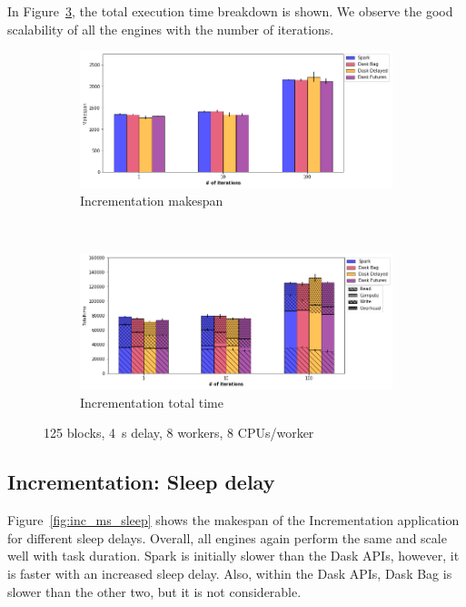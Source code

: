\documentclass[conference]{IEEEtran}
\begin{document}
In Figure~\ref{fig:inc_tt_itr}, the total execution time breakdown is
shown. We observe the good scalability of all the engines with the number of
iterations.


\begin{figure}[!t]
    \centering
    \begin{subfigure}[b]{\columnwidth}
        \includegraphics[clip,width=\columnwidth]{images/inc_itr.png}%
        \caption{Incrementation makespan}\label{fig:inc_ms_itr}
    \end{subfigure}
    \\
    \begin{subfigure}[b]{\columnwidth}
        \includegraphics[clip,width=\columnwidth]{images/inc_idle_itr.png}%
        \caption{Incrementation total time}\label{fig:inc_tt_itr}
    \end{subfigure}
    \caption{125 blocks, \SI{4}{\second} delay, 8 workers, 8 CPUs/worker}
\end{figure}

\subsection{Incrementation: Sleep delay}
Figure~\ref{fig:inc_ms_sleep} shows the makespan of the Incrementation application
for different sleep delays. Overall, all engines again perform the same and scale
well with task duration. Spark is initially slower than the Dask APIs, however, it is
faster with an increased sleep delay. Also, within the Dask APIs, Dask Bag is
slower than the other two, but it is not considerable.
\end{document}

